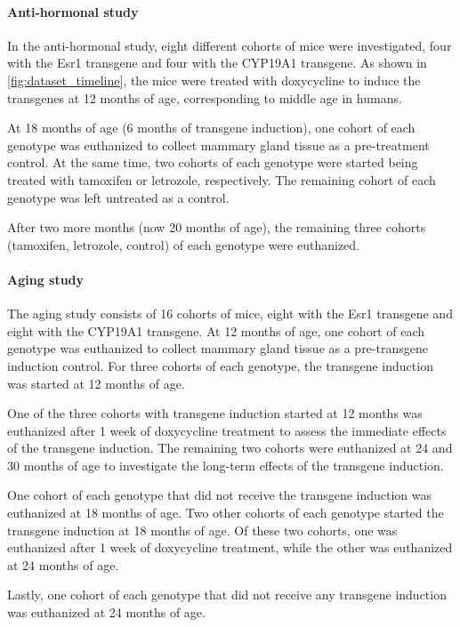 \paragraph{Anti-hormonal study}
In the anti-hormonal study, eight different cohorts of mice were investigated,
four with the Esr1 transgene and four with the CYP19A1 transgene.
As shown in \cref{fig:dataset_timeline}, the mice were treated with doxycycline
to induce the transgenes at 12 months of age, corresponding to middle age in
humans.

At 18 months of age (6 months of transgene induction), one cohort of each
genotype was euthanized to collect mammary gland tissue as a pre-treatment
control.
At the same time, two cohorts of each genotype were started being treated with
tamoxifen or letrozole, respectively.
The remaining cohort of each genotype was left untreated as a control.

After two more months (now 20 months of age), the remaining three cohorts
(tamoxifen, letrozole, control) of each genotype were
euthanized\supercite{furth_esr1_2023}.

\paragraph{Aging study}
The aging study consists of 16 cohorts of mice, eight with the Esr1 transgene
and eight with the CYP19A1 transgene.
At 12 months of age, one cohort of each genotype was euthanized to collect
mammary gland tissue as a pre-transgene induction control.
For three cohorts of each genotype, the transgene induction was started at 12
months of age.

One of the three cohorts with transgene induction started at 12 months was
euthanized after 1 week of doxycycline treatment to assess the immediate
effects of the transgene induction.
The remaining two cohorts were euthanized at 24 and 30 months of age to
investigate the long-term effects of the transgene induction.

One cohort of each genotype that did not receive the transgene induction was
euthanized at 18 months of age.
Two other cohorts of each genotype started the transgene induction at 18 months
of age.
Of these two cohorts, one was euthanized after 1 week of doxycycline treatment,
while the other was euthanized at 24 months of age.

Lastly, one cohort of each genotype that did not receive any transgene
induction was euthanized at 24 months of
age\supercite{furth_overexpression_2023}.

